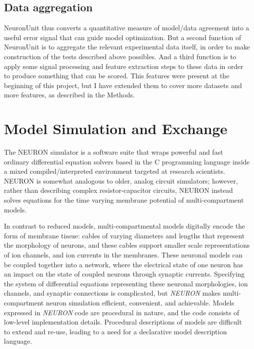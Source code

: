 \subsection{Data aggregation}
NeuronUnit thus converts a quantitative measure of model/data agreement into a useful error signal that can guide model optimization.
But a second function of NeuronUnit is to aggregate the relevant experimental data itself, in order to make  construction of the tests described above possibles.
And a third function is to apply some signal processing and feature extraction steps to these data in order to produce something that can be scored.
This features were present at the beginning of this project, but I have extended them to cover more datasets and more features, as described in the Methods.

\section{Model Simulation and Exchange}
The NEURON \cite{carnevale2006neuron} simulator is a software suite that wraps powerful and fast ordinary differential equation solvers based in the C programming language inside a mixed compiled/interpreted environment targeted at research scientists. NEURON is somewhat analogous to older, analog circuit simulators;
however, rather than describing complex resistor-capacitor circuits, NEURON instead solves equations for the time varying membrane potential of multi-compartment models.

In contrast to reduced models, multi-compartmental models digitally encode the form of membrane tissue: cables of varying diameters and lengths that represent the morphology of neurons, and these cables support smaller scale representations of ion channels, and ion currents in the membranes.
These neuronal models can be coupled together into a network, where the electrical state of one neuron has an impact on the state of coupled neurons through synaptic currents.
Specifying the system of differential equations representing these neuronal morphologies, ion channels, and synaptic connections is complicated, but \emph{NEURON} makes multi-compartment neuron simulation efficient, convenient, and achievable.
Models expressed in \emph{NEURON} code are procedural in nature, and the code consists of low-level implementation details.
Procedural descriptions of models are difficult to extend and re-use, leading to a need for a declarative model description language.

